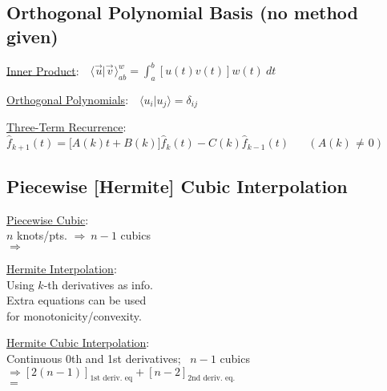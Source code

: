 \documentclass[12pt]{article}
\newcommand{\hs}{\hspace{1pt}}
\newcommand{\hsvec}[1]{\vec{\hs #1}}
\begin{document}
\vspace{5pt}
\subsection{Orthogonal Polynomial Basis (no method given)}

\vspace{10pt}
\parbox[t]{.55\textwidth}{%
    \underline{Inner Product}:\ \ \(
        \boxed{
            \langle \hsvec{u} | \hsvec{v} \hs \rangle_{ab}^w 
            = \int_a^b \left[ u(t) v(t) \right] w(t) \ dt 
        }
    \)
}
\parbox[t]{.44\textwidth}{%
    \underline{Orthogonal Polynomials}:\ \ \(
        \boxed{
            \langle u_i | u_j \rangle
            = \delta_{ij}
        }
    \)
}

\vspace{5pt}
\underline{Three-Term Recurrence}: \ \ \(
    \boxed{ \hat{f}_{k+1}(t) = \big[ A(k)t + B(k) \big] \hat{f}_k(t) - C(k) \hat{f}_{k-1}(t) } 
    \hspace{20pt} {\scriptstyle(A(k) \hs \neq\hs 0)}
\)

\subsection{Piecewise [Hermite] Cubic Interpolation}

\parbox[t]{5cm}{
    \underline{Piecewise Cubic}: \\[5pt]
    {\scriptsize 
        \(n\) knots/pts. \(\Rightarrow\ n-1\) cubics \\
        \(\Rightarrow\)  
    }
}
\parbox[t]{5cm}{
    \underline{Hermite Interpolation}: \\[5pt]
    {\scriptsize 
        Using \(k\)-th derivatives as info.\\
        Extra equations can be used \\
        for monotonicity/convexity.
    }
}
\parbox[t]{7cm}{
    \underline{Hermite Cubic Interpolation}: \\[5pt] 
    {\scriptsize 
        Continuous 0th and 1st derivatives; \ \(n-1\) cubics \\
        \(\Rightarrow [2(n-1)]_\text{1st deriv. eq} + [n-2]_\text{2nd deriv. eq.}\) \\
        \(=\) 
    }
}
\end{document}
